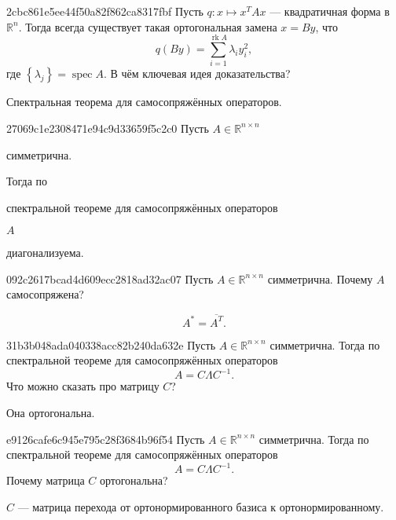 \begin{note}{2cbc861e5ee44f50a82f862ca8317fbf}
    Пусть \({ q : x \mapsto x^{T}Ax }\) --- квадратичная форма в \({ \mathbb R^{n} }\).
    Тогда всегда существует такая ортогональная замена \({ x = By }\), что
    \[
        q(By) = \sum_{i=1}^{\operatorname{rk} A} \lambda_i y_i^2,
    \]
    где \({ \left\{ \lambda_j \right\} = \operatorname{spec} A }\).
    В чём ключевая идея доказательства?

    \begin{cloze}{1}
        Спектральная теорема для самосопряжённых операторов.
    \end{cloze}
\end{note}

\begin{note}{27069c1e2308471e94c9d33659f5c2c0}
    Пусть \({ A \in \mathbb R^{n \times n} }\) \begin{icloze}{2}симметрична.\end{icloze}
    Тогда по \begin{icloze}{3}спектральной теореме для самосопряжённых операторов\end{icloze} \({ A }\) \begin{icloze}{1}диагонализуема.\end{icloze}
\end{note}

\begin{note}{092c2617bcad4d609ecc2818ad32ac07}
    Пусть \({ A \in \mathbb R^{n \times n} }\) симметрична.
    Почему \({ A }\) самосопряжена?

    \begin{cloze}{1}
        \[
            A^* = \overline{A^{T}}.
        \]
    \end{cloze}
\end{note}

\begin{note}{31b3b048ada040338acc82b240da632e}
    Пусть \({ A \in \mathbb R^{n \times n} }\) симметрична.
    Тогда по спектральной теореме для самосопряжённых операторов
    \[
        A = C \Lambda C^{-1}.
    \]
    Что можно сказать про матрицу \({ C }\)?

    \begin{cloze}{1}
        Она ортогональна.
    \end{cloze}
\end{note}

\begin{note}{e9126cafe6c945e795c28f3684b96f54}
    Пусть \({ A \in \mathbb R^{n \times n} }\) симметрична.
    Тогда по спектральной теореме для самосопряжённых операторов
    \[
        A = C \Lambda C^{-1}.
    \]
    Почему матрица \({ C }\) ортогональна?

    \begin{cloze}{1}
        \({ C }\) --- матрица перехода от ортонормированного базиса к ортонормированному.
    \end{cloze}
\end{note}

